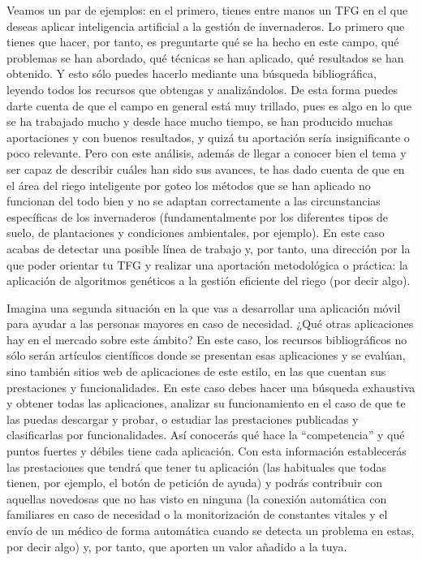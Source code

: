 Veamos un par de ejemplos: en el primero, tienes entre manos un TFG en el que deseas aplicar inteligencia artificial a la gestión de invernaderos. Lo primero que tienes que hacer, por tanto, es preguntarte qué se ha hecho en este campo, qué problemas se han abordado, qué técnicas se han aplicado, qué resultados se han obtenido. Y esto sólo puedes hacerlo mediante una búsqueda bibliográfica, leyendo todos los recursos que obtengas y analizándolos. De esta forma puedes darte cuenta de que el campo en general está muy trillado, pues es algo en lo que se ha trabajado mucho y desde hace mucho tiempo, se han producido muchas aportaciones y con buenos resultados, y quizá tu aportación sería insignificante o poco relevante. Pero con este análisis, además de llegar a conocer bien el tema y ser capaz de describir cuáles han sido sus avances, te has dado cuenta de que en el área del riego inteligente por goteo los métodos que se han aplicado no funcionan del todo bien y no se adaptan correctamente a las circunstancias específicas de los invernaderos (fundamentalmente por los diferentes tipos de suelo, de plantaciones y condiciones ambientales, por ejemplo). En este caso acabas de detectar una posible línea de trabajo y, por tanto, una dirección por la que poder orientar tu TFG y realizar una aportación metodológica o práctica: la aplicación de algoritmos genéticos a la gestión eficiente del riego (por decir algo). 

Imagina una segunda situación en la que vas a desarrollar una aplicación móvil para ayudar a las personas mayores en caso de necesidad. ¿Qué otras aplicaciones hay en el mercado sobre este ámbito? En este caso, los recursos bibliográficos no sólo serán artículos científicos donde se presentan esas aplicaciones y se evalúan, sino también  sitios web de aplicaciones de este estilo, en las que cuentan sus prestaciones y funcionalidades. En este caso debes hacer una búsqueda exhaustiva y obtener todas las aplicaciones, analizar su funcionamiento en el caso de que te las puedas descargar y probar, o estudiar las prestaciones publicadas y clasificarlas por funcionalidades. Así conocerás qué hace la ``competencia'' y qué puntos fuertes y débiles tiene cada aplicación. Con esta información establecerás las prestaciones que tendrá que tener tu aplicación (las habituales que todas tienen, por ejemplo, el botón de petición de ayuda) y podrás contribuir con aquellas novedosas que no has visto en ninguna (la conexión automática con familiares en caso de necesidad o la monitorización de constantes vitales y el envío de un médico de forma automática cuando se detecta un problema en estas, por decir algo) y, por tanto, que aporten un valor añadido a la tuya.

